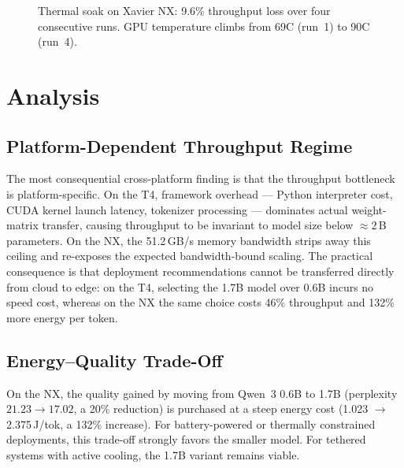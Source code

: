 \documentclass[conference]{IEEEtran}
\begin{document}
\begin{figure}[t]
\centering
{}
\caption{Thermal soak on Xavier NX: 9.6\% throughput loss over four consecutive runs. GPU temperature climbs from 69\textdegree C (run~1) to 90\textdegree C (run~4).}
\label{fig:thermal}
\end{figure}

\section{Analysis}

\subsection{Platform-Dependent Throughput Regime}
The most consequential cross-platform finding is that the throughput bottleneck is platform-specific. On the T4, framework overhead --- Python interpreter cost, CUDA kernel launch latency, tokenizer processing --- dominates actual weight-matrix transfer, causing throughput to be invariant to model size below ${\approx}2$\,B parameters. On the NX, the 51.2\,GB/s memory bandwidth strips away this ceiling and re-exposes the expected bandwidth-bound scaling. The practical consequence is that deployment recommendations cannot be transferred directly from cloud to edge: on the T4, selecting the 1.7B model over 0.6B incurs no speed cost, whereas on the NX the same choice costs 46\% throughput and 132\% more energy per token.

\subsection{Energy--Quality Trade-Off}
On the NX, the quality gained by moving from Qwen~3 0.6B to 1.7B (perplexity $21.23 \rightarrow 17.02$, a 20\% reduction) is purchased at a steep energy cost (1.023 $\rightarrow$ 2.375\,J/tok, a 132\% increase). For battery-powered or thermally constrained deployments, this trade-off strongly favors the smaller model. For tethered systems with active cooling, the 1.7B variant remains viable.
\end{document}
